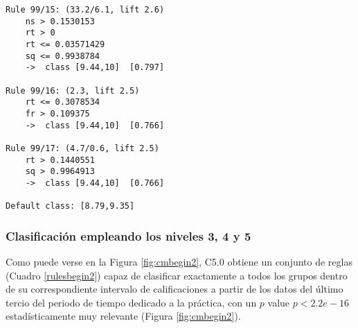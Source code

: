 \begin{tcolorbox}[title=Reglas de clasificación para identificar intervalos de notas.]
\begin{multicols}{3}
\begin{verbatim}
Rule 99/15: (33.2/6.1, lift 2.6)
	ns > 0.1530153
	rt > 0
	rt <= 0.03571429
	sq <= 0.9938784
	->  class [9.44,10]  [0.797]

Rule 99/16: (2.3, lift 2.5)
	rt <= 0.3078534
	fr > 0.109375
	->  class [9.44,10]  [0.766]

Rule 99/17: (4.7/0.6, lift 2.5)
	rt > 0.1440551
	sq > 0.9964913
	->  class [9.44,10]  [0.766]
	
Default class: [8.79,9.35]
    \end{verbatim}
  \end{multicols}
\end{tcolorbox}

\subsubsection{Clasificación empleando los niveles 3, 4 y 5}

Como puede verse en la Figura \ref{fig:cmbegin2}, C5.0 obtiene un conjunto de reglas (Cuadro \ref{rulesbegin2}) capaz de clasificar exactamente a todos los grupos dentro de su correspondiente intervalo de calificaciones a partir de los datos del último tercio del periodo de tiempo dedicado a la práctica, con un $p$ value $p < 2.2e-16$ estadísticamente muy relevante (Figura \ref{fig:cmbegin2}).

